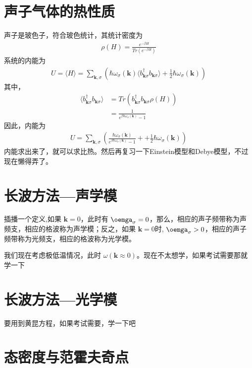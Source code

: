 \section{声子气体的热性质}
声子是玻色子，符合玻色统计，其统计密度为
\begin{equation}
    \begin{aligned} 
    \rho (H) = \frac{e^{-\beta H }}{ Tr (e^{-\beta H})}
    \end{aligned} 
\end{equation}
系统的内能为
\begin{equation}
    \begin{aligned} 
    U = \langle H \rangle = \sum_{\mathbf{k},\sigma}( \hbar \omega_\sigma (\mathbf{k} )\langle b^\dagger_{\mathbf{k}\sigma }b_{\mathbf{k}\sigma }\rangle +\frac{1}{2} \hbar \omega_\sigma (\mathbf{k} ))
    \end{aligned} 
\end{equation}
其中，
\begin{equation}
    \begin{aligned} 
        \langle b^\dagger_{\mathbf{k}\sigma }b_{\mathbf{k}\sigma }\rangle &=  Tr(b^\dagger_{\mathbf{k}\sigma }b_{\mathbf{k}\sigma } \rho(H)) \\
        &= \frac{1}{e^{\beta \hbar \omega_\sigma (\mathbf{k} )}-1}
    \end{aligned} 
\end{equation}
因此，内能为
\begin{equation}
    \begin{aligned} 
    U = \sum_{\mathbf{k},\sigma} \left( \frac{\hbar \omega_\sigma(\mathbf{k} )}{e^{\beta \hbar \omega_\sigma (\mathbf{k} )}-1}
    +  +\frac{1}{2} \hbar \omega_\sigma (\mathbf{k} ) \right)
    \end{aligned} 
\end{equation}
内能求出来了，就可以求比热。然后再复习一下Einstein模型和Debye模型，不过现在懒得弄了。
\section{长波方法---声学模}
\par 插播一个定义,如果 $\mathbf{k}= 0$，此时有
$\oemga_\sigma = 0$，那么，相应的声子频带称为声频支，相应的格波称为声学模；反之，如果 $\mathbf{k}= 0$时,
$\oemga_\sigma > 0$，相应的声子频带称为光频支，相应的格波称为光学模。
\par 我们现在考虑极低温情况，此时 $\omega (\mathbf{k}  \approx 0)$。现在不太想学，如果考试需要那就学一下
\section{长波方法---光学模}
要用到黄昆方程，如果考试需要，学一下吧
\section{态密度与范霍夫奇点}